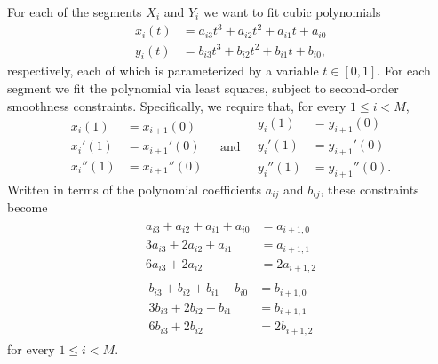 \documentclass[letterpaper,12pt]{article}
\begin{document}
\begin{enumerate}
  For each of the segments $X_i$ and $Y_i$ we want to fit cubic polynomials
  \begin{align*}
    x_i(t) &= a_{i3}t^3 + a_{i2}t^2 + a_{i1}t + a_{i0} \\
    y_i(t) &= b_{i3}t^3 + b_{i2}t^2 + b_{i1}t + b_{i0},
  \end{align*}
  respectively, each of which is parameterized by a variable
  $t \in [0, 1]$. For each segment we fit the polynomial via least
  squares, subject to second-order smoothness
  constraints. Specifically, we require that, for every $1 \leq i < M$,
  \begin{equation*}
    \begin{aligned}
      x_i(1) &= x_{i+1}(0) \\
      x_i'(1) &= x_{i+1}'(0) \\
      x_i''(1) &= x_{i+1}''(0)
    \end{aligned}
    \quad \text{and} \quad
    \begin{aligned}
      y_i(1) &= y_{i+1}(0) \\
      y_i'(1) &= y_{i+1}'(0) \\
      y_i''(1) &= y_{i+1}''(0).
    \end{aligned}
  \end{equation*}
  Written in terms of the polynomial coefficients $a_{ij}$ and
  $b_{ij}$, these constraints become
  \begin{align} \label{eq:a_constraints}
    \begin{split}
      a_{i3} + a_{i2} + a_{i1} + a_{i0} &= a_{i+1,0} \\
      3a_{i3} + 2a_{i2} + a_{i1} &= a_{i+1,1} \\
      6a_{i3} + 2a_{i2} &= 2a_{i+1,2}
    \end{split}
  \end{align}
  \begin{align} \label{eq:b_constraints}
    \begin{split}
      b_{i3} + b_{i2} + b_{i1} + b_{i0} &= b_{i+1,0} \\
      3b_{i3} + 2b_{i2} + b_{i1} &= b_{i+1,1} \\
      6b_{i3} + 2b_{i2} &= 2b_{i+1,2}
    \end{split}
  \end{align}
  for every $1 \leq i < M$.


\end{enumerate}
\end{document}
